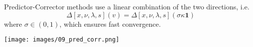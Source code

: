 \newpar{}

Predictor-Corrector methods use a linear combination of the two directions, i.e.\
\begin{equation*}
    \Delta [x,\nu,\lambda,s](v) =\Delta [x,\nu,\lambda,s](\sigma\kappa \mathbf{1})
\end{equation*}
where $\sigma\in (0,1)$, which ensures fast convergence.
\begin{center}
    \texttt{[image: images/09\_pred\_corr.png]}
\end{center}